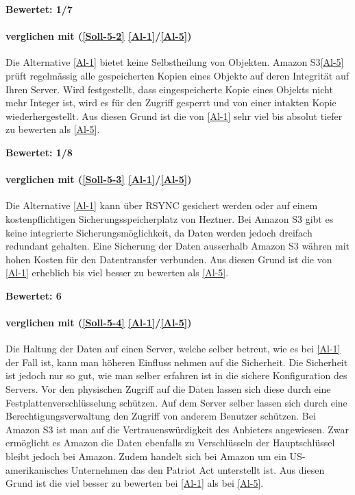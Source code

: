 \textbf{Bewertet: 1/7}


\paragraph*{  verglichen mit  (\ref{Soll-5-2} \ref{Al-1}/\ref{Al-5})} 
Die Alternative \ref{Al-1} bietet keine Selbstheilung von Objekten. Amazon S3\ref{Al-5} prüft regelmässig alle gespeicherten Kopien eines Objekte auf deren Integrität auf Ihren Server. Wird festgestellt, dass eingespeicherte Kopie eines Objekts nicht mehr Integer ist, wird es für den Zugriff gesperrt und von einer intakten Kopie wiederhergestellt. Aus diesen Grund ist die  von \ref{Al-1} sehr viel bis absolut tiefer zu bewerten als \ref{Al-5}.

\textbf{Bewertet: 1/8}

\paragraph*{  verglichen mit  (\ref{Soll-5-3} \ref{Al-1}/\ref{Al-5})} 
Die Alternative \ref{Al-1} kann über RSYNC gesichert werden oder auf einem kostenpflichtigen Sicherungsspeicherplatz von Heztner. Bei Amazon S3 gibt es keine integrierte Sicherungsmöglichkeit, da Daten werden jedoch dreifach redundant gehalten. Eine Sicherung der Daten ausserhalb Amazon S3 währen mit hohen Kosten für den Datentransfer verbunden. Aus diesen Grund ist die  von \ref{Al-1} erheblich bis viel besser zu bewerten als \ref{Al-5}.

\textbf{Bewertet: 6}

\paragraph*{  verglichen mit  (\ref{Soll-5-4} \ref{Al-1}/\ref{Al-5})} 
Die Haltung der Daten auf einen Server, welche selber betreut, wie es bei \ref{Al-1} der Fall ist, kann man höheren Einfluss nehmen auf die Sicherheit. Die Sicherheit ist jedoch nur so gut, wie man selber erfahren ist in die sichere Konfiguration des Servers. Vor den physischen Zugriff auf die Daten lassen sich diese durch eine Festplattenverschlüsselung schützen. Auf dem Server selber lassen sich durch eine Berechtigungsverwaltung den Zugriff von anderem Benutzer schützen. Bei Amazon S3 ist man auf die Vertrauenswürdigkeit des Anbieters angewiesen. Zwar ermöglicht es Amazon die Daten ebenfalls zu Verschlüsseln der Hauptschlüssel bleibt jedoch bei Amazon. Zudem handelt sich bei Amazon um ein US-amerikanisches Unternehmen das den Patriot Act unterstellt ist.
Aus diesen Grund ist die  viel besser zu bewerten bei \ref{Al-1} als bei \ref{Al-5}.

